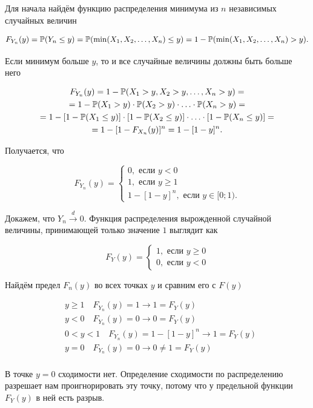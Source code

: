 \documentclass[12pt, a4paper, oneside]{article}
\begin{document}
\begin{sol}
Для начала найдём функцию распределения минимума из $n$ независимых случайных величин 

\begin{multline*} 
F_{Y_n}(y) = \mathbb{P}(Y_n \le y) = \mathbb{P}(\min(X_1, X_2, \ldots, X_n) \le y) = 1 - \mathbb{P}(\min(X_1, X_2, \ldots, X_n) > y).
\end{multline*} 

Если минимум больше $y$, то и все случайные величины должны быть больше него

\begin{multline*} 
F_{Y_n}(y) = 1 - \mathbb{P}(X_1 > y, X_2 > y, \ldots, X_n > y) = \\ = 1 - \mathbb{P}(X_1 > y) \cdot \mathbb{P}(X_2 > y) \cdot \ldots \cdot \mathbb{P}(X_n > y) = \\ = 1 - [1 - \mathbb{P}(X_1 \le y)] \cdot [1 - \mathbb{P}(X_2 \le y)] \cdot \ldots \cdot [1 - \mathbb{P}(X_n \le y)] = \\ = 1 - [1 - F_{X_n}(y)]^n = 1 - [1 - y]^n.
\end{multline*} 

Получается, что 

\begin{equation*} 
F_{Y_n}(y) = \begin{cases}0, \text{ если } y < 0 \\ 1, \text{ если } y \ge 1 \\ 1 - [1 - y]^n, \text{ если } y \in [0; 1).    \end{cases}
\end{equation*}

Докажем, что $Y_n \overset{d}{\to} 0.$ Функция распределения вырожденной случайной величины, принимающей только значение $1$ выглядит как 

\begin{equation*} 
F_{Y}(y) = \begin{cases}1, \text{ если } y \ge 0 \\ 0, \text{ если } y < 0 \end{cases}
\end{equation*}

Найдём предел $F_n(y)$ во всех точках $y$ и сравним его с $F(y)$

\begin{equation*} 
\begin{aligned} 
& y \ge 1 \quad F_{Y_n}(y) = 1 \to 1 = F_{Y}(y) \\ 
& y < 0 \quad F_{Y_n}(y) = 0 \to 0 = F_{Y}(y) \\ 
& 0 < y < 1 \quad F_{Y_n}(y) = 1 - [1 - y]^n \to 1 = F_{Y}(y) \\ 
& y = 0 \quad F_{Y_n}(y) = 0 \to 0 \ne 1 = F_{Y}(y) \\ 
\end{aligned} 
\end{equation*} 

В точке $y = 0$ сходимости нет. Определение сходимости по распределению разрешает нам проигнорировать эту точку, потому что у предельной функции $F_Y(y)$ в ней есть разрыв. 
\end{sol}
\end{document}
